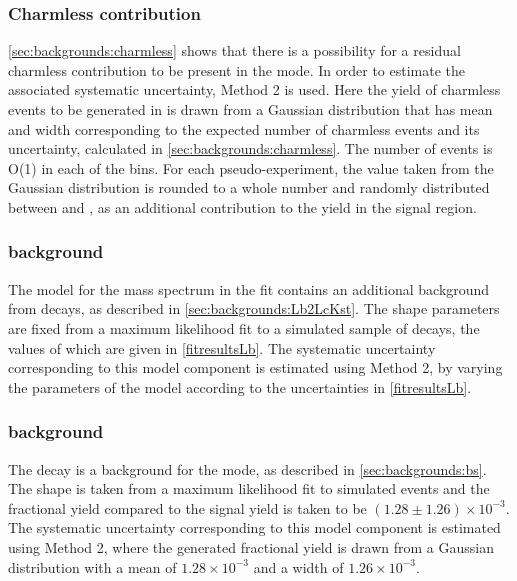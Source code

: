 \subsubsection{Charmless contribution}

\Sect\ref{sec:backgrounds:charmless} shows that there is a possibility for a residual charmless contribution to be present in the \pipi mode. In order to estimate the associated systematic uncertainty, Method 2 is used. Here the yield of charmless events to be generated in \pipi is drawn from a Gaussian distribution that has mean and width corresponding to the expected number of charmless events and its uncertainty, calculated in \sect\ref{sec:backgrounds:charmless}. The number of events is O(1) in each of the bins. For each pseudo-experiment, the value taken from the Gaussian distribution is rounded to a whole number and randomly distributed between \Bp and \Bm, as an additional contribution to the yield in the signal region. 

\subsubsection{\boldmath {} background}

The model for the \kk mass spectrum in the \CP fit contains an additional background from  decays, as described in \sect\ref{sec:backgrounds:Lb2LcKst}. The shape parameters are fixed from a maximum likelihood fit to a simulated sample of  decays, the values of which are given in \tab\ref{fitresultsLb}. The systematic uncertainty corresponding to this model component is estimated using Method 2, by varying the parameters of the model according to the uncertainties in \tab\ref{fitresultsLb}.

\subsubsection{\boldmath {} background}

The decay  is a background for the \pik mode, as described in \sect\ref{sec:backgrounds:bs}. The shape is taken from a maximum likelihood fit to simulated events and the fractional yield compared to the \pik signal yield is taken to be $(1.28 \pm 1.26) \times 10^{-3}$. The systematic uncertainty corresponding to this model component is estimated using Method 2, where the generated fractional yield is drawn from a Gaussian distribution with a mean of $1.28 \times 10^{-3}$ and a width of $1.26 \times 10^{-3}$.

